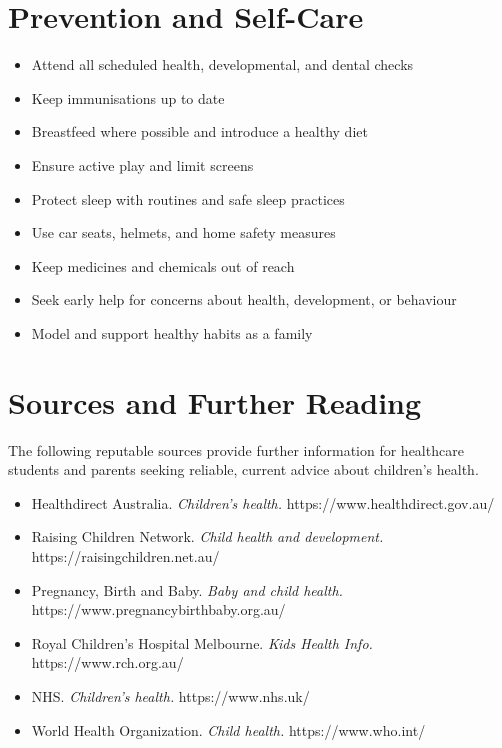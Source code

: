 \section*{Prevention and Self-Care}
\begin{itemize}
    \item Attend all scheduled health, developmental, and dental checks
    \item Keep immunisations up to date
    \item Breastfeed where possible and introduce a healthy diet
    \item Ensure active play and limit screens
    \item Protect sleep with routines and safe sleep practices
    \item Use car seats, helmets, and home safety measures
    \item Keep medicines and chemicals out of reach
    \item Seek early help for concerns about health, development, or behaviour
    \item Model and support healthy habits as a family
\end{itemize}

\section*{Sources and Further Reading}
The following reputable sources provide further information for healthcare students and parents seeking reliable, current advice about children's health.
\begin{itemize}
    \item Healthdirect Australia. \textit{Children's health.} https://www.healthdirect.gov.au/
    \item Raising Children Network. \textit{Child health and development.} https://raisingchildren.net.au/
    \item Pregnancy, Birth and Baby. \textit{Baby and child health.} https://www.pregnancybirthbaby.org.au/
    \item Royal Children's Hospital Melbourne. \textit{Kids Health Info.} https://www.rch.org.au/
    \item NHS. \textit{Children's health.} https://www.nhs.uk/
    \item World Health Organization. \textit{Child health.} https://www.who.int/
\end{itemize}
